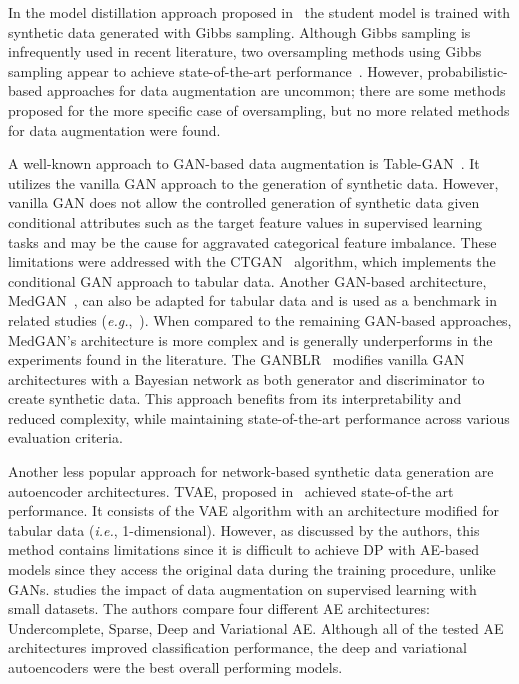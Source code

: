 In the model distillation approach proposed in~\cite{fakoor2020fast} the
student model is trained with synthetic data generated with Gibbs sampling.
Although Gibbs sampling is infrequently used in recent literature, two
oversampling methods using Gibbs sampling appear to achieve state-of-the-art
performance~\cite{das2014racog}. However, probabilistic-based approaches for
data augmentation are uncommon; there are some methods proposed for the more
specific case of oversampling, but no more related methods for data
augmentation were found.

A well-known approach to GAN-based data augmentation is
Table-GAN~\cite{park2018data}. It utilizes the vanilla GAN approach to the
generation of synthetic data. However, vanilla GAN does not allow the
controlled generation of synthetic data given conditional attributes such as
the target feature values in supervised learning tasks and may be the cause
for aggravated categorical feature imbalance. These limitations were addressed
with the CTGAN~\cite{xu2019modeling} algorithm, which implements the
conditional GAN approach to tabular data. Another GAN-based architecture,
MedGAN~\cite{armanious2020medgan}, can also be adapted for tabular data and is
used as a benchmark in related studies (\textit{e.g.},~\cite{xu2019modeling,
zhang2021ganblr}). When compared to the remaining GAN-based approaches,
MedGAN's architecture is more complex and is generally underperforms in the
experiments found in the literature. The GANBLR~\cite{zhang2021ganblr}
modifies vanilla GAN architectures with a Bayesian network as both generator
and discriminator to create synthetic data. This approach benefits from its
interpretability and reduced complexity, while maintaining state-of-the-art
performance across various evaluation criteria.

Another less popular approach for network-based synthetic data generation are
autoencoder architectures. TVAE, proposed in~\cite{xu2019modeling} achieved
state-of-the art performance.  It consists of the VAE algorithm with an
architecture modified for tabular data (\textit{i.e.}, 1-dimensional).
However, as discussed by the authors, this method contains limitations since
it is difficult to achieve DP with AE-based models since they access the
original data during the training procedure, unlike GANs.
\citet{delgado2021deep} studies the impact of data augmentation on supervised
learning with small datasets. The authors compare four different AE
architectures: Undercomplete, Sparse, Deep and Variational AE\@. Although all
of the tested AE architectures improved classification performance, the deep
and variational autoencoders were the best overall performing models.

